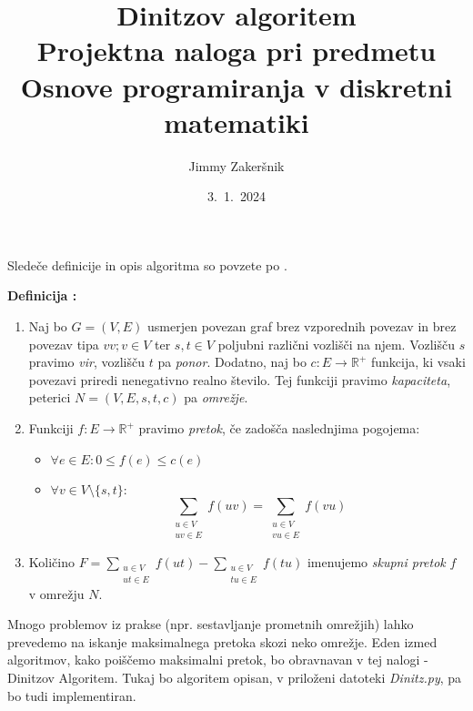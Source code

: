 \documentclass[a4paper, 10pt]{article}
\title{Dinitzov algoritem \\ {\large Projektna naloga pri predmetu Osnove programiranja v diskretni matematiki}}
\date{3.~1.~2024}
\author{Jimmy Zakeršnik}
\newcounter{defcount}
\newenvironment{definicija}{\begin{flushleft}\stepcounter{defcount}\textbf{Definicija \arabic{defcount}:}}{\hfill\end{flushleft}}
\newcommand{\mth}[1]{\ensuremath{\mathbb{#1}}}
\newcommand{\R}{\mth{R}}
\newcommand{\pojem}[1]{\emph{#1}}
\newcommand{\map}[3]{\ensuremath{{#1}: {#2} \rightarrow {#3}}}
\begin{document}
	\maketitle
	\thispagestyle{empty}
	\newpage
	Sledeče definicije in opis algoritma so povzete po \cite{bib:even}.
	\begin{definicija}
		\begin{enumerate}
			\item Naj bo $G = (V, E)$ usmerjen povezan graf brez vzporednih povezav in brez povezav tipa $vv; v\in V$ ter $s, t\in V$ poljubni različni vozlišči na njem. Vozlišču $s$ pravimo \pojem{vir}, vozlišču $t$ pa \pojem{ponor}. Dodatno, naj bo $\map{c}{E}{\R^+}$ funkcija, ki vsaki povezavi priredi nenegativno realno število. Tej funkciji pravimo \pojem{kapaciteta}, peterici $N = (V, E, s, t, c)$ pa \pojem{omrežje}.
			\item Funkciji $\map{f}{E}{\R^+}$ pravimo \pojem{pretok}, če zadošča naslednjima pogojema: \begin{itemize}
				\item $\forall e\in E: 0 \leq f(e) \leq c(e)$
				\item $\forall v\in V \setminus \{s, t\}$: \[\sum_{\substack{u\in V \\ uv\in E}} f(uv) = \sum_{\substack{u\in V \\ vu\in E}} f(vu)\]
			\end{itemize}
			\item Količino $F = \sum_{\substack{u\in V \\ ut\in E}} f(ut) - \sum_{\substack{u\in V \\ tu\in E}} f(tu)$ imenujemo \pojem{skupni pretok} $f$ v omrežju $N$.
		\end{enumerate}
	\end{definicija}
	Mnogo problemov iz prakse (npr. sestavljanje prometnih omrežjih) lahko prevedemo na iskanje maksimalnega pretoka skozi neko omrežje. Eden izmed algoritmov, kako poiščemo maksimalni pretok, bo obravnavan v tej nalogi - Dinitzov Algoritem. Tukaj bo algoritem opisan, v priloženi datoteki \textit{Dinitz.py}, pa bo tudi implementiran.
	
\end{document}
